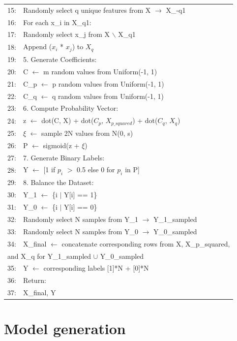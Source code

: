 \documentclass{article}
\begin{document}
\begin{table}[H]
\begin{tabularx}{\linewidth}{ll}
15: & \qquad Randomly select q unique features from X $\rightarrow$ X_{-q1} \\
16: & \qquad For each x_i in X_{q1}: \\
17: & \qquad\qquad Randomly select x\_j from X $\backslash$ X\_q1 \\
18: & \qquad\qquad Append ($x_i$ * $x_j$) to $X_q$ \\
19: & 5. Generate Coefficients: \\
20: & \qquad C $\leftarrow$ m random values from Uniform(-1, 1) \\
21: & \qquad C_p $\leftarrow$ p random values from Uniform(-1, 1) \\
22: & \qquad C_q $\leftarrow$ q random values from Uniform(-1, 1) \\
23: & 6. Compute Probability Vector: \\
24: & \qquad z $\leftarrow$ dot(C, X) + dot($C_p$, $X_{p\_squared}$) + dot($C_q$, $X_q$) \\
25: & \qquad $\xi$ $\leftarrow$ sample 2N values from N(0, s) \\
26: & \qquad P $\leftarrow$ sigmoid(z + $\xi$) \\
27: & 7. Generate Binary Labels: \\
28: & \qquad Y $\leftarrow$ [1 if $p_i$ $>$ 0.5 else 0 for $p_i$ in P] \\
29: & 8. Balance the Dataset: \\
30: & \qquad Y_1 $\leftarrow$ \{i $|$ Y[i] == 1\} \\
31: & \qquad Y_0 $\leftarrow$ \{i $|$ Y[i] == 0\} \\
32: & \qquad Randomly select N samples from Y\_1 $\rightarrow$ Y\_1\_sampled \\
33: & \qquad Randomly select N samples from Y\_0 $\rightarrow$ Y\_0\_sampled \\
34: & \qquad X\_final $\leftarrow$ concatenate corresponding rows from X, X\_p\_squared, \\ 
\multicolumn{2}{l}{\qquad\qquad and X\_q for Y\_1\_sampled $\cup$ Y\_0\_sampled} \\
35: & \qquad Y $\leftarrow$ corresponding labels [1]*N + [0]*N \\
36: & Return: \\
37: & \qquad X\_final, Y \\
\hline
\end{tabularx}
\end{table}

\section{Model generation}
\end{document}
